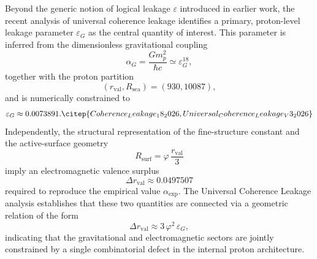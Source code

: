 \documentclass[11pt,a4paper]{article}
\begin{document}
Beyond the generic notion of logical leakage $\varepsilon$ introduced in earlier work, the recent analysis of universal coherence leakage identifies a primary, proton-level leakage parameter $\varepsilon_G$ as the central quantity of interest.\citep{Universal_Coherence_Leakage_V3_2026}
This parameter is inferred from the dimensionless gravitational coupling
\[
\alpha_G = \frac{G m_p^2}{\hbar c} \simeq \varepsilon_G^{18},
\]
together with the proton partition
\[
(r_{\mathrm{val}}, R_{\mathrm{sea}}) = (930, 10087),
\]
and is numerically constrained to
\[
\varepsilon_G \approx 0.0073891.\citep{Coherence_Leakage_18_2026,Universal_Coherence_Leakage_V3_2026}
\]
Independently, the structural representation of the fine-structure constant and the active-surface geometry
\[
R_{\mathrm{surf}} = \varphi\,\frac{r_{\mathrm{val}}}{3}
\]
imply an electromagnetic valence surplus
\[
\Delta r_{\mathrm{val}} \approx 0.0497507
\]
required to reproduce the empirical value $\alpha_{\exp}$.\citep{Alpha_PDL_v2_2026}
The Universal Coherence Leakage analysis establishes that these two quantities are connected via a geometric relation of the form
\[
\Delta r_{\mathrm{val}} \approx 3\,\varphi^2\,\varepsilon_G,
\]
indicating that the gravitational and electromagnetic sectors are jointly constrained by a single combinatorial defect in the internal proton architecture.
\end{document}
